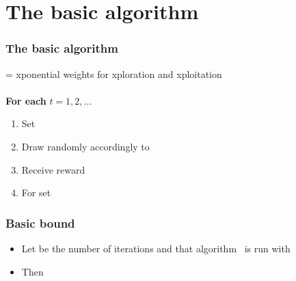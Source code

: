 \documentclass[handout]{beamer}
\begin{document}
\section{The basic algorithm}

\begin{frame}
\frametitle{The basic algorithm }
 = xponential weights for xploration and xploitation\\~\\

{\bf For each} $t=1,2,\ldots$
\begin{enumerate}
\item
Set
\R{\[
        \p{i}{t} = (1-\gamma)\frac{\wt{t}{i}}{\sum_{j=1}^K \wt{t}{j}} + \frac{\gamma}{K}
        \qquad i=1,\ldots,K.
\]}
\item      
Draw  randomly accordingly to 
\item
Receive reward \R{$\xit \in [0,1]$}
\item 
For  set 
\end{enumerate}
\end{frame}


\begin{frame}
\frametitle{Basic bound}
\begin{itemize}
\item
Let  be the number of iterations and that algorithm~\B{$\Aest$}
is run with 
\item
Then
\end{itemize}

\end{frame}
\end{document}
